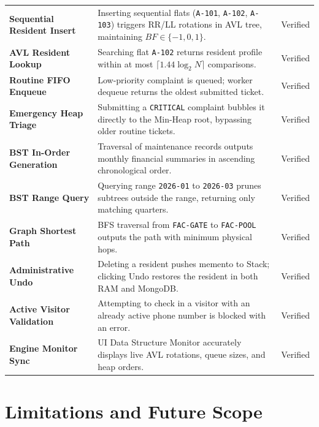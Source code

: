 \documentclass[12pt,a4paper]{article}
\begin{document}
\begin{xltabular}{\textwidth}{p{4.2cm} X c}
\textbf{Sequential Resident Insert} & Inserting sequential flats (\texttt{A-101}, \texttt{A-102}, \texttt{A-103}) triggers RR/LL rotations in AVL tree, maintaining $BF \in \{-1,0,1\}$. & Verified \\
\textbf{AVL Resident Lookup} & Searching flat \texttt{A-102} returns resident profile within at most $\lceil 1.44 \log_2 N \rceil$ comparisons. & Verified \\
\textbf{Routine FIFO Enqueue} & Low-priority complaint is queued; worker dequeue returns the oldest submitted ticket. & Verified \\
\textbf{Emergency Heap Triage} & Submitting a \texttt{CRITICAL} complaint bubbles it directly to the Min-Heap root, bypassing older routine tickets. & Verified \\
\textbf{BST In-Order Generation} & Traversal of maintenance records outputs monthly financial summaries in ascending chronological order. & Verified \\
\textbf{BST Range Query} & Querying range \texttt{2026-01} to \texttt{2026-03} prunes subtrees outside the range, returning only matching quarters. & Verified \\
\textbf{Graph Shortest Path} & BFS traversal from \texttt{FAC-GATE} to \texttt{FAC-POOL} outputs the path with minimum physical hops. & Verified \\
\textbf{Administrative Undo} & Deleting a resident pushes memento to Stack; clicking Undo restores the resident in both RAM and MongoDB. & Verified \\
\textbf{Active Visitor Validation} & Attempting to check in a visitor with an already active phone number is blocked with an error. & Verified \\
\textbf{Engine Monitor Sync} & UI Data Structure Monitor accurately displays live AVL rotations, queue sizes, and heap orders. & Verified \\
\end{xltabular}

\section{Limitations and Future Scope}
\end{document}

